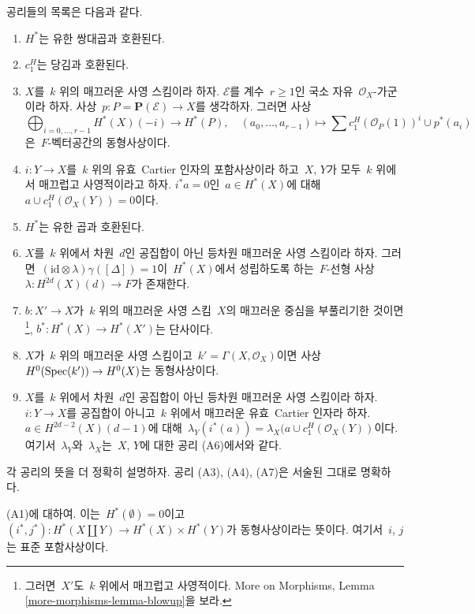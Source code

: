 \medskip\noindent
공리들의 목록은 다음과 같다.
\begin{enumerate}
\item[(A1)] $H^*$는 유한 쌍대곱과 호환된다.
\item[(A2)] $c_1^H$는 당김과 호환된다.
\item[(A3)] $X$를\  $k$ 위의 매끄러운 사영 스킴이라 하자.
$\mathcal{E}$를 계수\  $r \geq 1$인 국소 자유\ 
$\mathcal{O}_X$-가군이라 하자. 사상\ 
$p : P = \mathbf{P}(\mathcal{E}) \to X$를 생각하자. 그러면 사상
$$
\bigoplus\nolimits_{i = 0, \ldots, r - 1} H^*(X)(-i)
\longrightarrow H^*(P),\quad
(a_0, \ldots, a_{r - 1}) \longmapsto
\sum c_1^H(\mathcal{O}_P(1))^i \cup p^*(a_i)
$$
은\  $F$-벡터공간의 동형사상이다.
\item[(A4)] $i : Y \to X$를\  $k$ 위의 유효\  Cartier 인자의
포함사상이라 하고\  $X$, $Y$가 모두\  $k$ 위에서 매끄럽고 사영적이라고
하자. $i^*a = 0$인\  $a \in H^*(X)$에 대해\ 
$a \cup c_1^H(\mathcal{O}_X(Y)) = 0$이다.
\item[(A5)] $H^*$는 유한 곱과 호환된다.
\item[(A6)] $X$를\  $k$ 위에서 차원\  $d$인 공집합이 아닌 등차원
매끄러운 사영 스킴이라 하자. 그러면\ 
$(\text{id} \otimes \lambda) \gamma([\Delta]) =  1$이\  $H^*(X)$에서
성립하도록 하는\  $F$-선형 사상\ 
$\lambda : H^{2d}(X)(d) \to F$가 존재한다.
\item[(A7)] $b : X' \to X$가\  $k$ 위의 매끄러운 사영 스킴\  $X$의
매끄러운 중심을 부풀리기한 것이면\footnote{그러면\  $X'$도\  $k$
위에서 매끄럽고 사영적이다. More on Morphisms, Lemma
\ref{more-morphisms-lemma-blowup}을 보라.},
$b^* : H^*(X) \to H^*(X')$는 단사이다.
\item[(A8)] $X$가\  $k$ 위의 매끄러운 사영 스킴이고\ 
$k' = \Gamma(X, \mathcal{O}_X)$이면 사상\ 
$H^0(\mathop{\mathrm{Spec}}(k')) \to H^0(X)$는 동형사상이다.
\item[(A9)] $X$를\  $k$ 위에서 차원\  $d$인 공집합이 아닌 등차원
매끄러운 사영 스킴이라 하자. $i : Y \to X$를 공집합이 아니고\ 
$k$ 위에서 매끄러운 유효\  Cartier 인자라 하자.
$a \in H^{2d - 2}(X)(d - 1)$에 대해\ 
$\lambda_Y(i^*(a)) = \lambda_X(a \cup c_1^H(\mathcal{O}_X(Y))$이다.
여기서\  $\lambda_Y$와\  $\lambda_X$는\  $X$, $Y$에 대한 공리 (A6)에서와
같다.
\end{enumerate}
각 공리의 뜻을 더 정확히 설명하자. 공리 (A3), (A4), (A7)은
서술된 그대로 명확하다.

\medskip\noindent
(A1)에 대하여. 이는\  $H^*(\emptyset) = 0$이고\ 
$(i^*, j^*) : H^*(X \amalg Y) \to H^*(X) \times H^*(Y)$가
동형사상이라는 뜻이다. 여기서\  $i$, $j$는 표준 포함사상이다.

